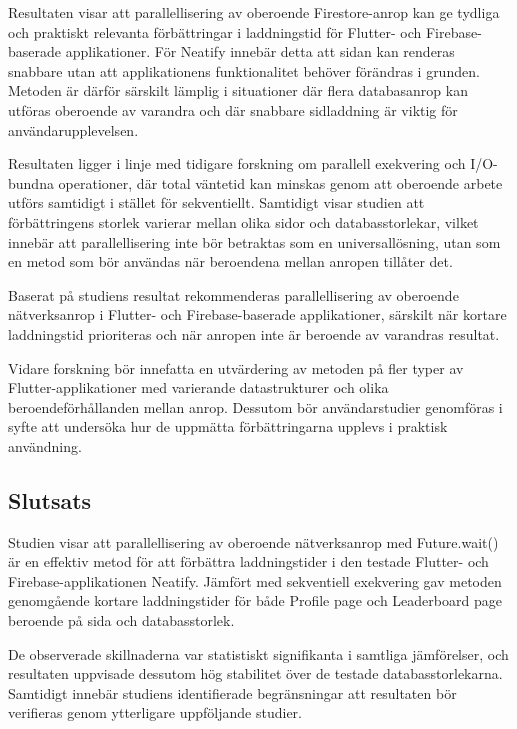 \documentclass[letterpaper,twocolumn,10pt]{article}
\begin{document}
Resultaten visar att parallellisering av oberoende Firestore-anrop kan ge
tydliga och praktiskt relevanta förbättringar i laddningstid för Flutter- och
Firebase-baserade applikationer. För Neatify innebär detta att sidan kan
renderas snabbare utan att applikationens funktionalitet behöver förändras i
grunden. Metoden är därför särskilt lämplig i situationer där flera databasanrop
kan utföras oberoende av varandra och där snabbare sidladdning är viktig för
användarupplevelsen.

Resultaten ligger i linje med tidigare forskning om parallell exekvering och
I/O-bundna operationer, där total väntetid kan minskas genom att oberoende
arbete utförs samtidigt i stället för sekventiellt. Samtidigt visar studien att
förbättringens storlek varierar mellan olika sidor och databasstorlekar, vilket
innebär att parallellisering inte bör betraktas som en universallösning, utan
som en metod som bör användas när beroendena mellan anropen tillåter det.

Baserat på studiens resultat rekommenderas parallellisering av oberoende
nätverksanrop i Flutter- och Firebase-baserade applikationer, särskilt när
kortare laddningstid prioriteras och när anropen inte är beroende av varandras
resultat.

Vidare forskning bör innefatta en utvärdering av metoden på fler typer av Flutter-applikationer med varierande datastrukturer och olika beroendeförhållanden mellan anrop. Dessutom bör användarstudier genomföras i syfte att undersöka hur de uppmätta förbättringarna upplevs i praktisk användning.

\subsection{Slutsats}

Studien visar att parallellisering av oberoende nätverksanrop med Future.wait()
är en effektiv metod för att förbättra laddningstider i den testade Flutter- och
Firebase-applikationen Neatify. Jämfört med sekventiell exekvering gav metoden
genomgående kortare laddningstider för både Profile page och Leaderboard page beroende på sida och databasstorlek.

De observerade skillnaderna var statistiskt signifikanta i samtliga jämförelser, och resultaten uppvisade dessutom hög stabilitet över de testade databasstorlekarna. Samtidigt innebär studiens identifierade begränsningar att resultaten bör verifieras genom ytterligare uppföljande studier.

\newpage

\begingroup
\sloppy


\endgroup

\clearpage
\appendix
\onecolumn


\end{document}
